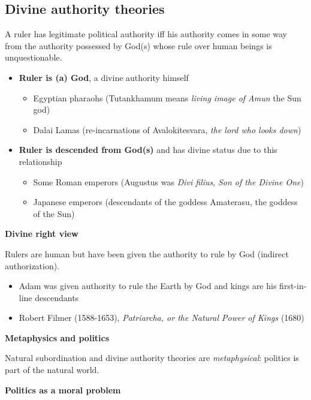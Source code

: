 \subsection{Divine authority theories}

A ruler has legitimate political authority iff his authority comes in some way
from the authority possessed by God(s) whose rule over human beings is 
unquestionable.

\begin{itemize}
    \item \textbf{Ruler is (a) God}, a divine authority himself
    \begin{itemize}
        \item Egyptian pharaohs (Tutankhamum means \textit{living image
        of Amun} the Sun god)
        \item Dalai Lamas (re-incarnations of Avalokitesvara, \textit{
        the lord who looks down})
    \end{itemize}
    \item \textbf{Ruler is descended from God(s)} and has divine status due to
    this relationship
    \begin{itemize}
        \item Some Roman emperors (Augustus was \textit{Divi filius},
        \textit{Son of the Divine One})
        \item Japanese emperors (descendants of the goddess Amaterasu,
        the goddess of the Sun)
    \end{itemize}
\end{itemize}

\textbf{Divine right view}

Rulers are human but have been given the authority to rule by God (indirect
authorization).

\begin{itemize}
    \item Adam was given authority to rule the Earth by God and kings are
    his first-in-line descendants
    \item Robert Filmer (1588-1653), \textit{Patriarcha, or the Natural
    Power of Kings} (1680)
\end{itemize}

\textbf{Metaphysics and politics}

Natural subordination and divine authority theories are \textit{metaphysical}:
politics is part of the natural world.

\textbf{Politics as a moral problem}

